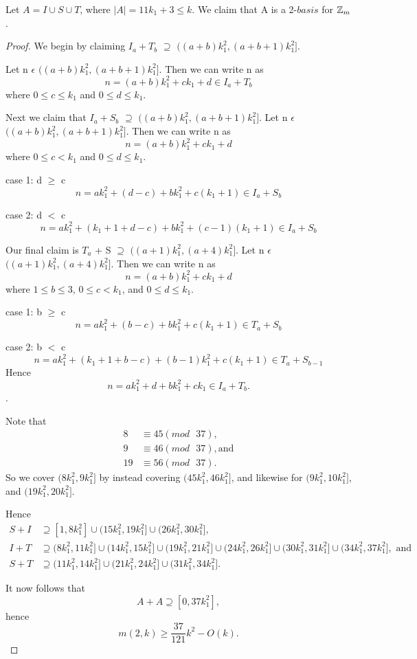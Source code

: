 Let $A = I \cup S \cup T$, where $|A| = 11k_1 + 3 \leq k$. We claim that A is a 2-$basis$ for $\mbox{$\mathbb Z$}_m$.
\\ 
\begin{proof}
We begin by claiming $I_a + T_b$ $\supseteq$ $((a + b)k_1^2 ,  (a + b + 1)k_1^2]$. 

Let n $\epsilon$ $((a + b)k_1^2 ,  (a + b + 1)k_1^2]$.
Then we can write n as 
\[
n = (a + b) k_1^2 + ck_1 + d \in I_a + T_b
\]
where $0 \leq c \leq k_1$ and $0 \leq d \leq k_1$. 

Next we claim that  $I_a + S_b$ $\supseteq$ $((a + b)k_1^2 ,  (a + b + 1)k_1^2]$. 
Let n $\epsilon$ $((a + b)k_1^2 ,  (a + b + 1)k_1^2]$.
Then we can write n as 
\[
n = (a + b) k_1^2 + ck_1 + d 
\]
where  $0 \leq c < k_1$ and $0 \leq d \leq k_1$. 

case 1: d $\geq$ c
\[
n = ak_1^2 + (d - c) + bk_1^2 + c(k_1 + 1) \in I_a + S_b
\]

case 2: d $<$ c
\[
n = ak_1^2 + (k_1 + 1 + d - c) + bk_1^2 + (c - 1)(k_1 + 1) \in  I_a + S_b
\]

Our final claim is $T_a$ + S $\supseteq$ $((a +1)k_1^2 ,  (a + 4)k_1^2]$. 
Let n $\epsilon$ $((a +1)k_1^2 ,  (a + 4)k_1^2]$.
Then we can write n as 
\[
n = (a + b) k_1^2 + ck_1 + d 
\]
where $1 \leq b \leq 3$, $0 \leq c < k_1$, and $0 \leq d \leq k_1$. 

case 1: b $\geq$ c
\[
n = ak_1^2 + (b - c) + bk_1^2 + c(k_1 + 1) \in T_a + S_b
\]

case 2: b $<$ c
\[
n = ak_1^2 + (k_1 + 1 + b - c) + (b - 1)k_1^2 + c(k_1 + 1) \in  T_a + S_{b-1}
\]
Hence 
\[
n = ak_1^2 + d + bk_1^2 + ck_1 \in I_a + T_b.
\].

Note that
\begin{align*}
8 &\equiv 45 (mod\text{ }37),\\
 9 &\equiv 46 (mod\text{ }37),  \text{and} \\
19 &\equiv 56 (mod\text{ }37).
\end{align*} 
So we cover $(8k_1^2, 9k_1^2]$ by instead covering $(45k_1^2, 46k_1^2]$, and likewise for $(9k_1^2, 10k_1^2]$, and $(19k_1^2, 20k_1^2]$. 

Hence 
\begin{align*}
S + I &\supseteq [1, 8k_1^2] \cup (15k_1^2, 19k_1^2] \cup (26k_1^2, 30k_1^2],\\
I + T &\supseteq (8k_1^2, 11k_1^2] \cup (14k_1^2, 15k_1^2] \cup (19k_1^2, 21k_1^2] \cup (24k_1^2, 26k_1^2] \cup (30k_1^2, 31k_1^2] \cup (34k_1^2, 37k_1^2],\text{ and}\\
S + T &\supseteq (11k_1^2, 14k_1^2] \cup (21k_1^2, 24k_1^2] \cup (31k_1^2, 34k_1^2]. 
\end{align*}

It now follows that 
\[
A + A \supseteq [0, 37k_1^2],
\]
hence
\[
m(2,k) \geq \frac{37}{121}k^2 - O(k). 
\]


\end{proof}
